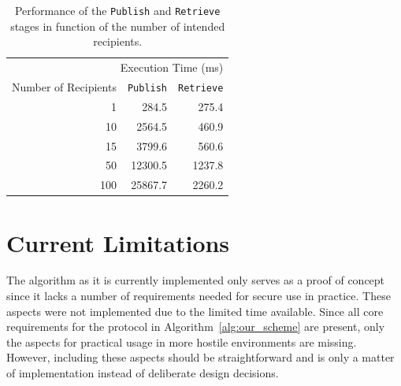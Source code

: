 \begin{table}
  \centering
  \begin{tabular}{@{}rrr@{}} \toprule
    \multicolumn{3}{r}{Execution Time (ms)} \\ \cmidrule(r){2-3}
    Number of Recipients & \texttt{Publish} & \texttt{Retrieve} \\ \midrule
    1 & 284.5 & 275.4  \\
    10 & 2564.5  & 460.9  \\
    15 & 3799.6  & 560.6  \\
    50 & 12300.5  & 1237.8  \\
    100 & 25867.7  & 2260.2  \\  \bottomrule
  \end{tabular}
  \caption{Performance of the \texttt{Publish} and \texttt{Retrieve} stages in function of the number of intended recipients.}
  \label{table:performance_publish_and_retrieve}
\end{table}

\section{Current Limitations}
\label{sec:limitations_of_implementation}
The algorithm as it is currently implemented only serves as a proof of concept since it lacks a number of requirements needed for secure use in practice. These aspects were not implemented due to the limited time available. Since all core requirements for the protocol in Algorithm~\ref{alg:our_scheme} are present, only the aspects for practical usage in more hostile environments are missing. However, including these aspects should be straightforward and is only a matter of implementation instead of deliberate design decisions.

